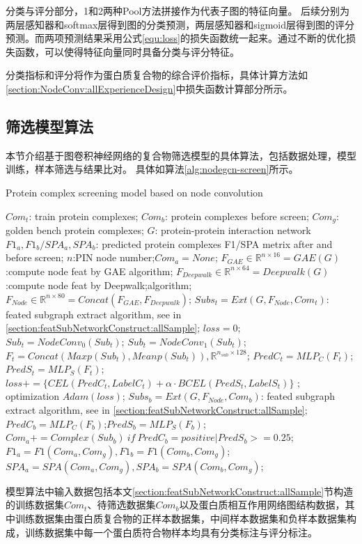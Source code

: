 分类与评分部分，1和2两种Pool方法拼接作为代表子图的特征向量。
后续分别为两层感知器和softmax层得到图的分类预测，两层感知器和sigmoid层得到图的评分预测。而两项预测结果采用公式\ref{equ:loss}的损失函数统一起来。通过不断的优化损失函数，可以使得特征向量同时具备分类与评分特征。

分类指标和评分将作为蛋白质复合物的综合评价指标，具体计算方法如\ref{section:NodeConv:allExperienceDesign}中损失函数计算部分所示。

\subsection{筛选模型算法}

本节介绍基于图卷积神经网络的复合物筛选模型的具体算法，包括数据处理，模型训练，样本筛选与结果比对。
具体如算法\ref{alg:nodegcn-screen}所示。

\begin{algorithm}[h]
    \caption{Protein complex screening model based on node convolution} %
    \label{alg:nodegcn-screen}
    \begin{algorithmic}[1]
        \Require
        $Com_t$: train protein complexes;
        $Com_b$: protein complexes before screen;
        $Com_g$: golden bench protein complexes;
        $G$: protein-protein interaction network
        \Ensure
        $F1_a,F1_b/SPA_a,SPA_b$: predicted protein complexes F1/SPA metrix after and before screen;
        \State $n$:PIN node number;$Com_a=None$;
        \State $F_{GAE} \in \mathbb{R}^{n\times 16}=GAE(G)$:compute node feat by GAE algorithm;
        \State $F_{Deepwalk} \in \mathbb{R}^{n\times 64}=Deepwalk(G)$:compute node feat by Deepwalk;algorithm;
        \State $F_{Node} \in \mathbb{R}^{n\times 80}=Concat(F_{GAE},F_{Deepwalk})$;
        \State $Subs_t=Ext(G,F_{Node},Com_t)$: feated subgraph extract algorithm, see in \ref{section:featSubNetworkConstruct:allSample};
         $loss=0$;
        \State $Sub_t=NodeConv_0(Sub_t)$;
        \State $Sub_t=NodeConv_1(Sub_t)$;
        \State $F_t=Concat(Maxp(Sub_t),Meanp(Sub_t)),\mathbb{R}^{n_{sub}\times 128}$;
        \State $PredC_t=MLP_C(F_t)$;$PredS_t=MLP_S(F_t)$;
        \State $loss+=\{CEL(PredC_t,LabelC_t)+\alpha \cdot BCEL(PredS_t,LabelS_t)\}$
        \EndFor; optimization $Adam(loss)$;
        \EndFor
        \EndFor
        \State $Subs_b=Ext(G,F_{Node},Com_b)$: feated subgraph extract algorithm, see in \ref{section:featSubNetworkConstruct:allSample};
         $PredC_b=MLP_C(F_b)$;$PredS_b=MLP_S(F_b)$;
        \State $Com_a+=Complex(Sub_b)~if~PredC_b=positive|PredS_b>=0.25$;
        \EndFor
        \State $F1_a=F1(Com_a,Com_g),F1_b=F1(Com_b,Com_g)$;
        \State $SPA_a=SPA(Com_a,Com_g),SPA_b=SPA(Com_b,Com_g)$;
    \end{algorithmic}
\end{algorithm}
模型算法中输入数据包括本文\ref{section:featSubNetworkConstruct:allSample}节构造的训练数据集$Com_t$、待筛选数据集$Com_b$以及蛋白质相互作用网络图结构数据，其中训练数据集由蛋白质复合物的正样本数据集，中间样本数据集和负样本数据集构成，训练数据集中每一个蛋白质符合物样本均具有分类标注与评分标注。

